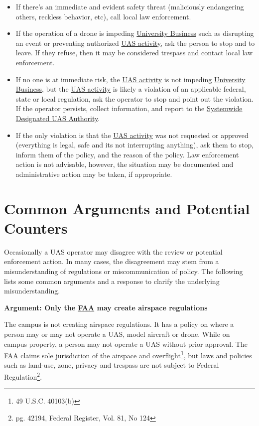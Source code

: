 \documentclass[
]{book}
\providecommand{\tightlist}{%
  \setlength{\itemsep}{0pt}\setlength{\parskip}{0pt}}
\begin{document}
\begin{itemize}
\tightlist
\item
  If there's an immediate and evident safety threat (maliciously endangering others, reckless behavior, etc), call local law enforcement.
\item
  If the operation of a drone is impeding \protect\hyperlink{UB}{University Business} such as disrupting an event or preventing authorized \protect\hyperlink{UASactivity}{UAS activity}, ask the person to stop and to leave. If they refuse, then it may be considered trespass and contact local law enforcement.
\item
  If no one is at immediate risk, the \protect\hyperlink{UASactivity}{UAS activity} is not impeding \protect\hyperlink{UB}{University Business}, but the \protect\hyperlink{UASactivity}{UAS activity} is likely a violation of an applicable federal, state or local regulation, ask the operator to stop and point out the violation. If the operator persists, collect information, and report to the \protect\hyperlink{SDA}{Systemwide Designated UAS Authority}.
\item
  If the only violation is that the \protect\hyperlink{UASactivity}{UAS activity} was not requested or approved (everything is legal, safe and its not interrupting anything), ask them to stop, inform them of the policy, and the reason of the policy. Law enforcement action is not advisable, however, the situation may be documented and administrative action may be taken, if appropriate.
\end{itemize}

\hypertarget{common-arguments-and-potential-counters}{%
\section{Common Arguments and Potential Counters}\label{common-arguments-and-potential-counters}}

Occasionally a UAS operator may disagree with the review or potential enforcement action. In many cases, the disagreement may stem from a misunderstanding of regulations or miscommunication of policy. The following lists some common arguments and a response to clarify the underlying misunderstanding.

\textbf{Argument: Only the \protect\hyperlink{FAA}{FAA} may create airspace regulations}

The campus is not creating airspace regulations. It has a policy on where a person may or may not operate a UAS, model aircraft or drone. While on campus property, a person may not operate a UAS without prior approval. The \protect\hyperlink{FAA}{FAA} claims sole jurisdiction of the airspace and overflight\footnote{49 U.S.C. 40103(b)}, but laws and policies such as land-use, zone, privacy and trespass are not subject to Federal Regulation\footnote{pg. 42194, Federal Register, Vol. 81, No 124}.
\end{document}

